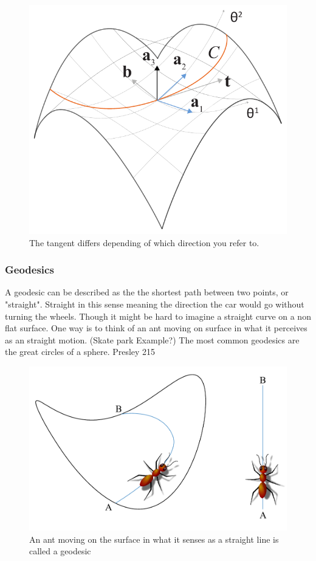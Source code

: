 \begin{figure}[H]
\centering
\includegraphics[width=0.7\linewidth ]{figure/Theory/CurveOnSurface.pdf}
\caption{The tangent differs depending of which direction you refer to. }
\end{figure}



\subsubsection{Geodesics}

A geodesic can be described as the the shortest path between two points, or "straight". Straight in this sense meaning the direction the car would go without turning the wheels. Though it might be hard to imagine a straight curve on a non flat surface. One way is to think of an ant moving on surface in what it perceives as an straight motion. (Skate park Example?) The most common geodesics are the great circles of a sphere. Presley 215

\begin{figure}[H]
\centering
\includegraphics[width=0.7\linewidth ]{figure/Theory/Geodesics.pdf}
\caption{An ant moving on the surface in what it senses as a straight line is called a geodesic }
\end{figure}

